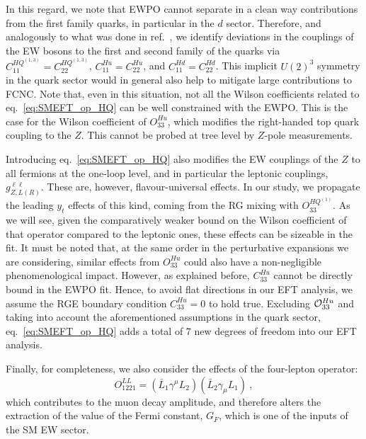 In this regard, we note that EWPO cannot separate in a clean way contributions from the first family quarks, in particular in the $d$ sector. Therefore, and analogously to what was done in ref.~\cite{deBlas:2019wgy}, we identify deviations in the couplings of the EW bosons to the first and second family of the quarks via $C^{{HQ}^{(1,3)}}_{11} = C^{{HQ}^{(1,3)}}_{22} $, $C^{Hu}_{11} = C^{Hu}_{22} $, and $C^{Hd}_{11} = C^{Hd}_{22} $. This implicit $U(2)^3$ symmetry in the quark sector would in general also help to mitigate large contributions to FCNC. Note that, even in this situation, not all the Wilson coefficients related to eq.~\eqref{eq:SMEFT_op_HQ} can be well constrained with the EWPO. This is the case for the Wilson coefficient of $O^{Hu}_{33}$, which modifies the right-handed top quark coupling to the $Z$. This cannot be probed at tree level by $Z$-pole measurements. 

Introducing eq.~\eqref{eq:SMEFT_op_HQ} also modifies the EW couplings of the $Z$ to all fermions at the one-loop level, and in particular the leptonic couplings, $g_{Z,L(R)}^{\ell\ell}$. These are, however, flavour-universal effects. In our study, we propagate the leading $y_t$ effects of this kind, coming from the RG mixing with $O_{33}^{HQ^{(1)}}$. As we will see, given the comparatively weaker bound on the Wilson coefficient of that operator compared to the leptonic ones, these effects can be sizeable in the fit. It must be noted that, at the same order in the perturbative expansions we are considering, similar effects from $O_{33}^{Hu}$ could also have a non-negligible phenomenological impact. However, as explained before, $C_{33}^{Hu}$ cannot be directly bound in the EWPO fit. Hence, to avoid flat directions in our EFT analysis, we assume the RGE boundary condition $C_{33}^{Hu}=0$ to hold true. Excluding ${\cal O}_{33}^{Hu}$ and taking into account the aforementioned assumptions in the quark sector, eq.~\eqref{eq:SMEFT_op_HQ} adds a total of 7 new degrees of freedom into our EFT analysis.

Finally, for completeness, we also consider the effects of the four-lepton operator:
\begin{equation}
	\label{eq:SMEFT_op_LLLL}
	O_{1221}^{LL}=(\bar{L}_1 \gamma^\mu L_2) (\bar{L}_2 \gamma_\mu L_1) \ ,
\end{equation}
which contributes to the muon decay amplitude, and therefore alters the extraction of the value of the Fermi constant, $G_F$, which is one of the inputs of the SM EW sector.

